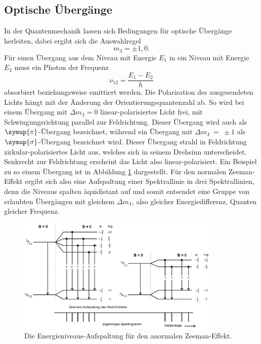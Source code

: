 \subsection{Optische Übergänge}
\label{sec:opt}
In der Quantenmechanik lassen sich Bedingungen für optische Übergänge herleiten, dabei ergibt sich die Auswahlregel
\begin{equation*}
    m_\text{J} = \pm 1, 0.
\end{equation*}
Für einen Übergang aus dem Niveau mit Energie $E_1$ in ein Niveau mit Energie $E_2$ muss
ein Photon der Frequenz
\begin{equation}
    \label{eqn:freq}
    \nu_{12} = \frac{E_1-E_2}{h} 
\end{equation}
absorbiert beziehungsweise emittiert werden.
Die Polarisation des ausgesendeten Lichts hängt mit der Änderung der Orientierungsquantenzahl ab.
So wird bei einem Übergang mit $\Delta m_\text{J} = 0$ linear-polarisiertes Licht frei, mit Schwingungsrichtung
parallel zur Feldrichtung. Dieser Übergang wird auch als $\symup{\pi}$-Übergang bezeichnet, während ein Übergang mit
$\Delta m_\text{J}~=~\pm1$ als $\symup{\sigma}$-Übergang bezeichnet wird. Dieser Übergang strahl in Feldrichtung
zirkular-polarisiertes Licht aus, welches sich in seinem Drehsinn unterscheidet. Senkrecht zur Feldrichtung erscheint das 
Licht also linear-polarisiert. Ein Beispiel zu so einem Übergang ist in Abbildung \ref{fig:aufspaltung} dargestellt.
Für den normalen Zeeman-Effekt ergibt sich also eine Aufspaltung einer Spektrallinie in drei Spektrallinien, 
denn die Niveaus spalten äquidistant auf und somit entsendet eine Gruppe von erlaubten Übergängen
mit gleichem $\Delta m_\text{J}$, also gleicher Energiedifferenz, Quanten gleicher Frequenz.

\begin{figure}[htb]
  \centering
  \includegraphics[height=5.5cm]{content/pictures/Aufspaltung.png}
  \caption{Die Energieniveaus-Aufspaltung für den anormalen Zeeman-Effekt. \cite{anleitung_alt}}
  \label{fig:aufspaltung}
\end{figure}
\FloatBarrier